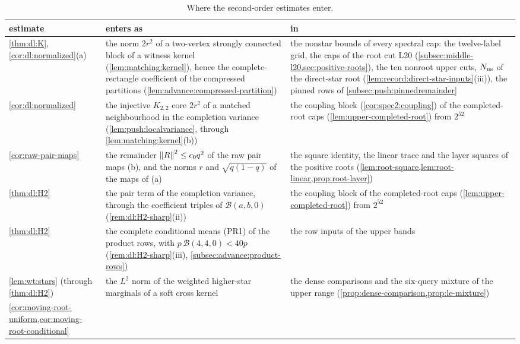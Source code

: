 \begin{table}[ht]
\small
\caption{Where the second-order estimates enter.}\label{tab:second-order-uses}
\begin{tabular}{@{}>{\raggedright\arraybackslash}p{3.1cm}%
>{\raggedright\arraybackslash}p{5.6cm}>{\raggedright\arraybackslash}p{5.4cm}@{}}
\toprule
estimate & enters as & in\\
\midrule
\cref{thm:dl:K}, \cref{cor:dl:normalized}(a)
 & the norm $2r^2$ of a two-vertex strongly connected block of a witness kernel
   (\cref{lem:matching:kernel}), hence the complete-rectangle coefficient of the
   compressed partitions (\cref{lem:advance:compressed-partition})
 & the nonstar bounds of every spectral cap: the twelve-label grid, the caps of
   the root cut L20 (\cref{subsec:middle-l20,sec:positive-roots}), the ten
   nonroot upper cuts, $N_{\rm ns}$ of the direct-star root
   (\cref{lem:record:direct-star-inputs}(iii)), the pinned rows of \cref{subsec:push:pinnedremainder}\\
\cref{cor:dl:normalized}
 & the injective $K_{2,2}$ core $2r^2$ of a matched neighbourhood in the
   completion variance (\cref{lem:push:localvariance}, through
   \cref{lem:matching:kernel}(b))
 & the coupling block (\cref{cor:spec2:coupling}) of the completed-root caps (\cref{lem:upper-completed-root})
   from $2^{52}$\\
\cref{cor:raw-pair-maps}
 & the remainder $\left\|R\right\|^2\le c_0q^2$ of the raw pair maps (b), and the norms
   $r$ and $\sqrt{q(1-q)}$ of the maps of (a)
 & the square identity, the linear trace and the layer squares of the
   positive roots
   (\cref{lem:root-square,lem:root-linear,prop:root-layer})\\
\cref{thm:dl:H2}
 & the pair term of the completion variance, through the coefficient triples of
   $\mathcal B(a,b,0)$ (\cref{rem:dl:H2-sharp}(ii))
 & the coupling block of the completed-root caps (\cref{lem:upper-completed-root}) from $2^{52}$\\
\cref{thm:dl:H2}
 & the complete conditional means (PR1) of the product rows, with
   $p\,\mathcal B(4,4,0)<40p$ (\cref{rem:dl:H2-sharp}(iii),
   \cref{subsec:advance:product-rows})
 & the row inputs of the upper bands\\
\cref{lem:wt:stars} (through \cref{thm:dl:H2})
 & the $L^2$ norm of the weighted higher-star marginals of a soft cross kernel
 & the dense comparisons and the six-query mixture of the upper range
   (\cref{prop:dense-comparison,prop:le-mixture})\\
\cref{cor:moving-root-uniform,cor:moving-root-conditional}

\end{tabular}
\end{table}
